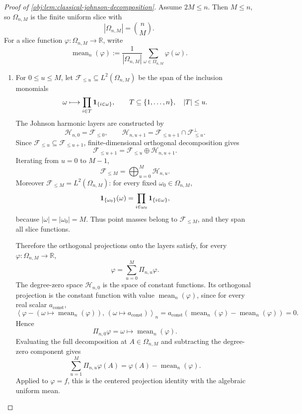 \begin{proof}[Proof of \cref{obj:lem:classical-johnson-decomposition}]
Assume \(2M\le n\). Then \(M\le n\), so \(\Omega_{n,M}\) is the finite uniform slice with
\[
|\Omega_{n,M}|=\binom nM .
\]
For a slice function \(\varphi:\Omega_{n,M}\to\mathbb R\), write
\[
\operatorname{mean}_n(\varphi)
:=
\frac{1}{|\Omega_{n,M}|}\sum_{\omega\in\Omega_{n,M}}\varphi(\omega).
\]

\begin{enumerate}
\item For \(0\le u\le M\), let \(\mathcal F_{\le u}\subseteq L^2(\Omega_{n,M})\) be the span of the inclusion monomials
\[
\omega\longmapsto \prod_{i\in T}{\bf 1}_{\{i\in\omega\}},
\qquad
T\subseteq\{1,\ldots,n\},\quad |T|\le u .
\]
The Johnson harmonic layers are constructed by
\[
\mathcal H_{n,0}=\mathcal F_{\le 0},
\qquad
\mathcal H_{n,u+1}
=
\mathcal F_{\le u+1}\cap \mathcal F_{\le u}^{\perp}.
\]
Since \(\mathcal F_{\le u}\subseteq \mathcal F_{\le u+1}\), finite-dimensional orthogonal decomposition gives
\[
\mathcal F_{\le u+1}
=
\mathcal F_{\le u}\oplus \mathcal H_{n,u+1}.
\]
Iterating from \(u=0\) to \(M-1\),
\[
\mathcal F_{\le M}
=
\bigoplus_{u=0}^{M}\mathcal H_{n,u}.
\]
Moreover \(\mathcal F_{\le M}=L^2(\Omega_{n,M})\): for every fixed
\(\omega_0\in\Omega_{n,M}\),
\[
{\bf 1}_{\{\omega_0\}}(\omega)
=
\prod_{i\in\omega_0}{\bf 1}_{\{i\in\omega\}},
\]
because \(|\omega|=|\omega_0|=M\). Thus point masses belong to \(\mathcal F_{\le M}\), and they span all slice functions.

Therefore the orthogonal projections onto the layers satisfy, for every
\(\varphi:\Omega_{n,M}\to\mathbb R\),
\[
\varphi
=
\sum_{u=0}^{M}\Pi_{n,u}\varphi .
\]
The degree-zero space \(\mathcal H_{n,0}\) is the space of constant functions. Its orthogonal projection is the constant function with value \(\operatorname{mean}_n(\varphi)\), since for every real scalar \(a_{\mathrm{const}}\),
\[
\left\langle
\varphi-(\omega\mapsto \operatorname{mean}_n(\varphi)),
\,(\omega\mapsto a_{\mathrm{const}})
\right\rangle_n
=
a_{\mathrm{const}}
\left(
\operatorname{mean}_n(\varphi)-\operatorname{mean}_n(\varphi)
\right)
=0 .
\]
Hence
\[
\Pi_{n,0}\varphi=\omega\mapsto \operatorname{mean}_n(\varphi).
\]
Evaluating the full decomposition at \(A\in\Omega_{n,M}\) and subtracting the degree-zero component gives
\[
\sum_{u=1}^{M}\Pi_{n,u}\varphi(A)
=
\varphi(A)-\operatorname{mean}_n(\varphi).
\]
Applied to \(\varphi=f\), this is the centered projection identity with the algebraic uniform mean. %


\end{enumerate}
\end{proof}
